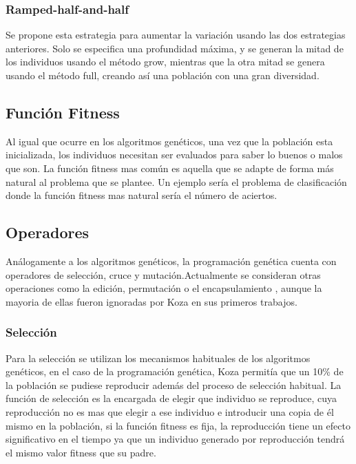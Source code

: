 \documentclass[12pt]{article} \usepackage[utf8x]{inputenc}
\begin{document}
\subsubsection{Ramped-half-and-half}

Se propone esta estrategia para aumentar la variación usando las dos
estrategias anteriores. Solo se especifica una profundidad máxima, y
se generan la mitad de los individuos usando el método grow, mientras
que la otra mitad se genera usando el método full, creando así una
población con una gran diversidad.

\subsection{Función Fitness}

Al igual que ocurre en los algoritmos genéticos, una vez que la
población esta inicializada, los individuos necesitan ser evaluados
para saber lo buenos o malos que son. La función fitness mas
común es aquella que se adapte de forma más natural al problema que se
plantee. Un ejemplo sería el problema de clasificación donde la
función fitness mas natural sería el número de aciertos.

\subsection{Operadores}

Análogamente a los algoritmos genéticos, la programación genética
cuenta con operadores de selección, cruce y mutación.Actualmente se
consideran otras operaciones como la edición, permutación o el
encapsulamiento , aunque la mayoria de ellas fueron ignoradas por Koza
en sus primeros trabajos.

\subsubsection{Selección}

Para la selección se utilizan los mecanismos habituales de los
algoritmos genéticos, en el caso de la programación genética, Koza
permitía que un 10\% de la población se pudiese reproducir además del
proceso de selección habitual. La función de selección es la encargada
de elegir que individuo se reproduce, cuya reproducción no es mas que
elegir a ese individuo e introducir una copia de él mismo en la
población, si la función fitness es fija, la reproducción tiene un
efecto significativo en el tiempo ya que un individuo generado por
reproducción tendrá el mismo valor fitness que su padre.
\end{document}

